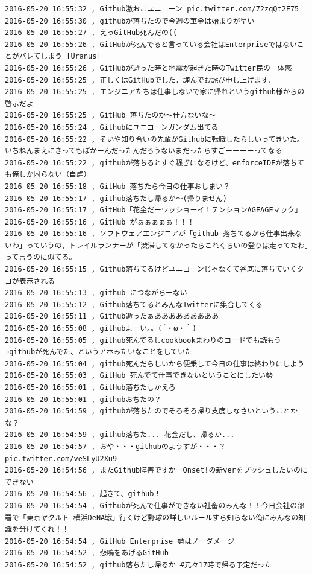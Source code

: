 \begin{verbatim}
2016-05-20 16:55:32 , Github激おこユニコーン pic.twitter.com/72zqQt2F75
2016-05-20 16:55:30 , githubが落ちたので今週の華金は始まりが早い
2016-05-20 16:55:27 , えっGitHub死んだの((
2016-05-20 16:55:26 , GitHubが死んでると言っている会社はEnterpriseではないことがバレてしまう [Uranus]
2016-05-20 16:55:26 , GitHubが逝った時と地震が起きた時のTwitter民の一体感
2016-05-20 16:55:25 , 正しくはGitHubでした．謹んでお詫び申し上げます．
2016-05-20 16:55:25 , エンジニアたちは仕事しないで家に帰れというgithub様からの啓示だよ
2016-05-20 16:55:25 , GitHub 落ちたのか〜仕方ないな〜
2016-05-20 16:55:24 , Githubにユニコーンガンダム出てる
2016-05-20 16:55:22 , そいや知り合いの先輩がGithubに転職したらしいってきいた。いちねんまえにきってもぽかーんだったんだろうないまだったらすごーーーーってなる
2016-05-20 16:55:22 , githubが落ちるとすぐ騒ぎになるけど、enforceIDEが落ちても俺しか困らない（自虐）
2016-05-20 16:55:18 , GitHub 落ちたら今日の仕事おしまい？
2016-05-20 16:55:17 , github落ちたし帰るか〜(帰りません)
2016-05-20 16:55:17 , GitHub「花金だーワッショーイ！テンションAGEAGEマック」
2016-05-20 16:55:16 , GitHub がぁぁぁぁぁ！！！
2016-05-20 16:55:16 , ソフトウェアエンジニアが「github 落ちてるから仕事出来ないわ」っていうの、トレイルランナーが「渋滞してなかったらこれくらいの登りは走ってたわ」って言うのに似てる。
2016-05-20 16:55:15 , Github落ちてるけどユニコーンじゃなくて谷底に落ちていくタコが表示される
2016-05-20 16:55:13 , github につながらーない
2016-05-20 16:55:12 , Github落ちてるとみんなTwitterに集合してくる
2016-05-20 16:55:11 , Github逝ったぁあああああああああ
2016-05-20 16:55:08 , githubよーい。。(´・ω・｀)
2016-05-20 16:55:05 , github死んでるしcookbookまわりのコードでも読もう→githubが死んでた、というアホみたいなことをしていた
2016-05-20 16:55:04 , github死んだらしいから便乗して今日の仕事は終わりにしよう
2016-05-20 16:55:03 , GitHub 死んでて仕事できないということにしたい勢
2016-05-20 16:55:01 , GitHub落ちたしかえろ
2016-05-20 16:55:01 , githubおちたの？
2016-05-20 16:54:59 , githubが落ちたのでそろそろ帰り支度しなさいということかな？
2016-05-20 16:54:59 , github落ちた... 花金だし、帰るか... 
2016-05-20 16:54:57 , おや・・・githubのようすが・・・？ pic.twitter.com/veSLyU2Xu9
2016-05-20 16:54:56 , またGithub障害ですかーOnset!の新verをプッシュしたいのにできない
2016-05-20 16:54:56 , 起きて、github！
2016-05-20 16:54:54 , Githubが死んで仕事ができない社畜のみんな！！今日会社の部署で「東京ヤクルト-横浜DeNA戦」行くけど野球の詳しいルールすら知らない俺にみんなの知識を分けてくれ！！
2016-05-20 16:54:54 , GitHub Enterprise 勢はノーダメージ
2016-05-20 16:54:52 , 悲鳴をあげるGitHub
2016-05-20 16:54:52 , github落ちたし帰るか #元々17時で帰る予定だった

\end{verbatim}
